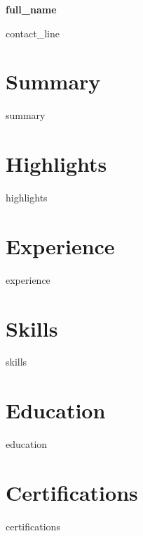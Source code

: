 \documentclass[10pt,a4paper]{article}
\begin{document}
{\LARGE\bfseries {{ full_name }}}

{{ contact_line }}

\section*{Summary}
{{ summary }}

\section*{Highlights}
\begin{itemize}[leftmargin=*,nosep]
{{ highlights }}
\end{itemize}

\section*{Experience}
\begin{itemize}[leftmargin=*,nosep]
{{ experience }}
\end{itemize}

\section*{Skills}
{{ skills }}

\section*{Education}
\begin{itemize}[leftmargin=*,nosep]
{{ education }}
\end{itemize}

\section*{Certifications}
\begin{itemize}[leftmargin=*,nosep]
{{ certifications }}
\end{itemize}
\end{document}
